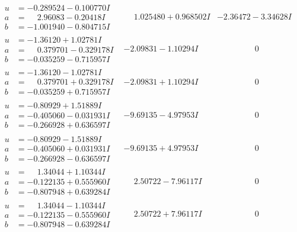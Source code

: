 \documentclass[1p]{elsarticle_modified}
\theoremstyle{definition}
\begin{document}
$$\begin{array}{c|c|c}
\begin{aligned}
u &= -0.289524 - 0.100770 I \\
a &= \phantom{-}2.96083 - 0.20418 I \\
b &= -1.001940 - 0.804715 I\end{aligned}
 & \phantom{-}1.025480 + 0.968502 I & -2.36472 - 3.34628 I \\ \hline\begin{aligned}
u &= -1.36120 + 1.02781 I \\
a &= \phantom{-}0.379701 - 0.329178 I \\
b &= -0.035259 - 0.715957 I\end{aligned}
 & -2.09831 - 1.10294 I & \phantom{-0.000000 } 0 \\ \hline\begin{aligned}
u &= -1.36120 - 1.02781 I \\
a &= \phantom{-}0.379701 + 0.329178 I \\
b &= -0.035259 + 0.715957 I\end{aligned}
 & -2.09831 + 1.10294 I & \phantom{-0.000000 } 0 \\ \hline\begin{aligned}
u &= -0.80929 + 1.51889 I \\
a &= -0.405060 - 0.031931 I \\
b &= -0.266928 + 0.636597 I\end{aligned}
 & -9.69135 - 4.97953 I & \phantom{-0.000000 } 0 \\ \hline\begin{aligned}
u &= -0.80929 - 1.51889 I \\
a &= -0.405060 + 0.031931 I \\
b &= -0.266928 - 0.636597 I\end{aligned}
 & -9.69135 + 4.97953 I & \phantom{-0.000000 } 0 \\ \hline\begin{aligned}
u &= \phantom{-}1.34044 + 1.10344 I \\
a &= -0.122135 + 0.555960 I \\
b &= -0.807948 + 0.639284 I\end{aligned}
 & \phantom{-}2.50722 - 7.96117 I & \phantom{-0.000000 } 0 \\ \hline\begin{aligned}
u &= \phantom{-}1.34044 - 1.10344 I \\
a &= -0.122135 - 0.555960 I \\
b &= -0.807948 - 0.639284 I\end{aligned}
 & \phantom{-}2.50722 + 7.96117 I & \phantom{-0.000000 } 0 \\ \hline\begin{aligned}

\end{aligned}
\end{array}$$
\end{document}

